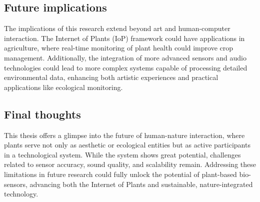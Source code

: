 \subsection{Future implications}

The implications of this research extend beyond art and human-computer interaction. The Internet of Plants (IoP) framework could have applications in agriculture, where real-time monitoring of plant health could improve crop management. Additionally, the integration of more advanced sensors and audio technologies could lead to more complex systems capable of processing detailed environmental data, enhancing both artistic experiences and practical applications like ecological monitoring.


\subsection{Final thoughts}

This thesis offers a glimpse into the future of human-nature interaction, where plants serve not only as aesthetic or ecological entities but as active participants in a technological system. While the system shows great potential, challenges related to sensor accuracy, sound quality, and scalability remain. Addressing these limitations in future research could fully unlock the potential of plant-based bio-sensors, advancing both the Internet of Plants and sustainable, nature-integrated technology.